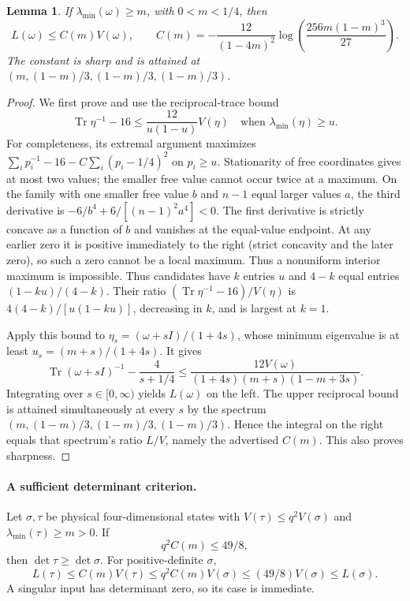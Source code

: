 \documentclass[11pt,a4paper]{article}
\newcommand{\Tr}{\operatorname{Tr}}
\newtheorem{lemma}{Lemma}
\begin{document}
\begin{lemma}\label{t3:lem:upper}
If $\lambda_{\min}(\omega)\ge m$, with $0<m<1/4$, then
\[
 L(\omega)\le C(m)V(\omega),\qquad
 C(m)=-\frac{12}{(1-4m)^2}
       \log\!\left(\frac{256m(1-m)^3}{27}\right).
\]
The constant is sharp and is attained at
$(m,(1-m)/3,(1-m)/3,(1-m)/3)$.
\end{lemma}
\begin{proof}
We first prove and use the reciprocal-trace bound
\[
 \Tr\eta^{-1}-16\le\frac{12}{u(1-u)}V(\eta)
       \quad\text{when }\lambda_{\min}(\eta)\ge u.
\]
For completeness, its extremal argument maximizes
$\sum_i p_i^{-1}-16-C\sum_i(p_i-1/4)^2$ on $p_i\ge u$.
Stationarity of free coordinates gives at most two values; the
smaller free value cannot occur twice at a maximum. On the family
with one smaller free value $b$ and $n-1$ equal larger values $a$,
the third derivative is $-6/b^4+6/[(n-1)^2a^4]<0$.
The first derivative is strictly concave as a function of $b$ and
vanishes at the equal-value endpoint. At any earlier zero it is positive
immediately to the right (strict concavity and the later zero), so such
a zero cannot be a local maximum. Thus a nonuniform interior maximum
is impossible. Thus candidates have
$k$ entries $u$ and $4-k$ equal entries $(1-ku)/(4-k)$.
Their ratio $(\Tr\eta^{-1}-16)/V(\eta)$ is
$4(4-k)/[u(1-ku)]$, decreasing in $k$, and is largest at $k=1$.

Apply this bound to
$\eta_s=(\omega+sI)/(1+4s)$, whose minimum eigenvalue is at least
$u_s=(m+s)/(1+4s)$. It gives
\[
 \Tr(\omega+sI)^{-1}-\frac4{s+1/4}
 \le\frac{12V(\omega)}{(1+4s)(m+s)(1-m+3s)}.
\]
Integrating over $s\in[0,\infty)$ yields $L(\omega)$ on the left.
The upper reciprocal bound is attained simultaneously at every
$s$ by the spectrum $(m,(1-m)/3,(1-m)/3,(1-m)/3)$.
Hence the integral on the right equals that spectrum's ratio
$L/V$, namely the advertised $C(m)$. This also proves sharpness.
\end{proof}

\paragraph{A sufficient determinant criterion.}
Let $\sigma,\tau$ be physical four-dimensional states with
$V(\tau)\le q^2V(\sigma)$ and $\lambda_{\min}(\tau)\ge m>0$.
If
\[
 q^2C(m)\le49/8,
\]
then $\det\tau\ge\det\sigma$. For positive-definite $\sigma$,
\[
 L(\tau)\le C(m)V(\tau)\le q^2C(m)V(\sigma)
         \le(49/8)V(\sigma)\le L(\sigma).
\]
A singular input has determinant zero, so its case is immediate.
\end{document}
